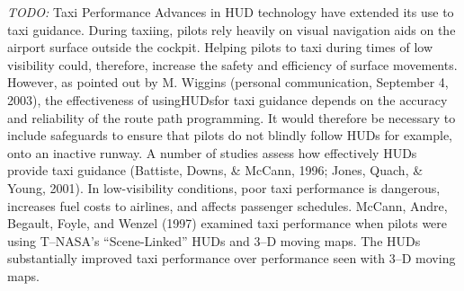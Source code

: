 \documentclass[utf8,bachelor,manualbib]{gradu3}
\begin{document}
\emph{TODO:}
Taxi Performance
Advances in HUD technology have extended its use to taxi guidance. During taxiing,
pilots rely heavily on visual navigation aids on the airport surface outside the
cockpit. Helping pilots to taxi during times of low visibility could, therefore, increase
the safety and efficiency of surface movements. However, as pointed out by
M. Wiggins (personal communication, September 4, 2003), the effectiveness of usingHUDsfor
taxi guidance depends on the accuracy and reliability of the route path
programming. It would therefore be necessary to include safeguards to ensure that
pilots do not blindly follow HUDs for example, onto an inactive runway.
A number of studies assess how effectively HUDs provide taxi guidance
(Battiste, Downs, \& McCann, 1996; Jones, Quach, \& Young, 2001). In
low-visibility conditions, poor taxi performance is dangerous, increases fuel costs
to airlines, and affects passenger schedules. McCann, Andre, Begault, Foyle, and
Wenzel (1997) examined taxi performance when pilots were using T–NASA’s
“Scene-Linked” HUDs and 3–D moving maps. The HUDs substantially improved
taxi performance over performance seen with 3–D moving maps. \citep{crawford2006}
\end{document}
